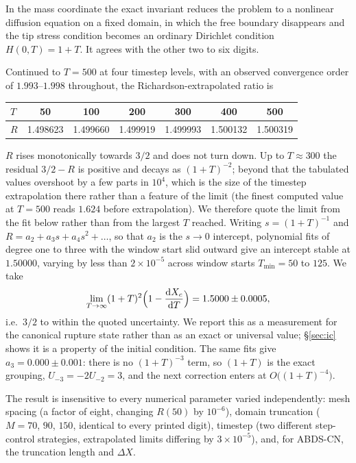 \documentclass[11pt,a4paper]{article}
\newcommand{\AB}{\textsf{ABDS-CN}}
\newcommand{\Xc}{X_{c}}
\begin{document}
In the mass coordinate the exact invariant reduces the problem to a nonlinear
diffusion equation on a fixed domain, in which the free boundary disappears and
the tip stress condition becomes an ordinary Dirichlet condition
$H(0,T) = 1+T$. It agrees with the other two to six digits.

Continued to $T = 500$ at four timestep levels, with an observed convergence
order of $1.993$--$1.998$ throughout, the Richardson-extrapolated ratio is

\begin{center}
\begin{tabular}{lcccccc}
\toprule
$T$      & 50 & 100 & 200 & 300 & 400 & 500 \\
\midrule
$R$      & 1.498623 & 1.499660 & 1.499919 & 1.499993 & 1.500132 & 1.500319 \\
\bottomrule
\end{tabular}
\end{center}

$R$ rises monotonically towards $3/2$ and does not turn down. Up to
$T \approx 300$ the residual $3/2 - R$ is positive and decays as $(1+T)^{-2}$;
beyond that the tabulated values overshoot by a few parts in $10^{4}$, which is
the size of the timestep extrapolation there rather than a feature of the limit
(the finest computed value at $T = 500$ reads $1.624$ before extrapolation).
We therefore quote the limit from the fit below rather than from the largest
$T$ reached. Writing $s = (1+T)^{-1}$ and
$R = a_2 + a_3 s + a_4 s^2 + \dots$, so that $a_2$ is the $s \to 0$ intercept,
polynomial fits of degree one to three with the window start slid outward give
an intercept stable at $1.50000$, varying by less than $2\times10^{-5}$ across
window starts $T_{\min} = 50$ to $125$. We take
%
\begin{equation}
  \lim_{T\to\infty} (1+T)^{2}\Bigl(1-\frac{\mathrm{d}\Xc}{\mathrm{d}T}\Bigr)
  = 1.5000 \pm 0.0005 ,
  \label{eq:threehalves}
\end{equation}
%
i.e.\ $3/2$ to within the quoted uncertainty. We report this as a measurement
for the canonical rupture state rather than as an exact or universal value;
\S\ref{sec:ic} shows it is a property of the initial condition. The same fits give
$a_3 = 0.000 \pm 0.001$: there is no $(1+T)^{-3}$ term, so $(1+T)$ is the exact
grouping, $U_{-3} = -2U_{-2} = 3$, and the next correction enters at
$O\bigl((1+T)^{-4}\bigr)$.

The result is insensitive to every numerical parameter varied independently:
mesh spacing (a factor of eight, changing $R(50)$ by $10^{-6}$), domain
truncation ($M = 70$, $90$, $150$, identical to every printed digit), timestep
(two different step-control strategies, extrapolated limits differing by
$3\times10^{-5}$), and, for \AB, the truncation length and $\Delta X$.
\end{document}
